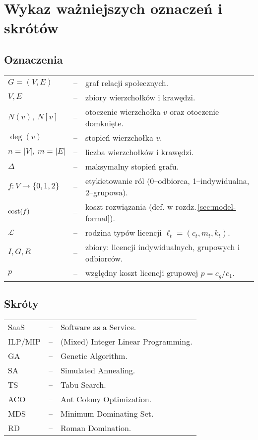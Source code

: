 \chapter*{Wykaz ważniejszych oznaczeń i skrótów}

\section*{Oznaczenia}

\begin{tabular}{@{} l l p{} @{}}
    $G=(V,E)$    & -- & graf relacji społecznych. \\
    $V,E$        & -- & zbiory wierzchołków i krawędzi. \\
    $N(v),\ N[v]$ & -- & otoczenie wierzchołka $v$ oraz otoczenie domknięte. \\
    $\deg(v)$    & -- & stopień wierzchołka $v$. \\
    $n=|V|,\ m=|E|$ & -- & liczba wierzchołków i krawędzi. \\
    $\Delta$     & -- & maksymalny stopień grafu. \\
    $f:V\to\{0,1,2\}$ & -- & etykietowanie ról (0–odbiorca, 1–indywidualna, 2–grupowa). \\
    $\operatorname{cost}(f)$   & -- & koszt rozwiązania (def. w rozdz.\,\ref{sec:model-formal}). \\
    $\mathcal{L}$ & -- & rodzina typów licencji $\ell_t=(c_t,m_t,k_t)$. \\
    $I,G,R$      & -- & zbiory: licencji indywidualnych, grupowych i odbiorców. \\
    $p$          & -- & względny koszt licencji grupowej $p=c_g/c_1$. \\
\end{tabular}

\section*{Skróty}

\begin{tabular}{@{} l l p{} @{}}
    SaaS & -- & Software as a Service. \\
    ILP/MIP & -- & (Mixed) Integer Linear Programming. \\
    GA   & -- & Genetic Algorithm. \\
    SA   & -- & Simulated Annealing. \\
    TS   & -- & Tabu Search. \\
    ACO  & -- & Ant Colony Optimization. \\
    MDS  & -- & Minimum Dominating Set. \\
    RD   & -- & Roman Domination. \\
\end{tabular}

